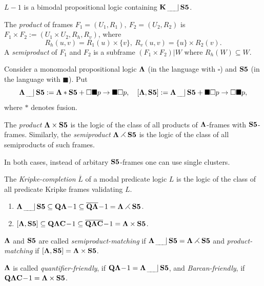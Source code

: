 \documentclass[twoside]{aiml20}
\def\bsq{\blacksquare}
\def\ri{\rightarrow}
\def\BK{{\bf K}}
\def\BQ{{\bf Q}}
\def\BC{{\bf C}}
\def\sqr{\square}
\def\bLa{{\bf \Lambda}}
\def\sem0{\,_{\_\!\_\!\_}\!|\,}
\def\sem{\,_{\_\!\_\!\_}\!|\,\bS5}
\def\rtt{\rightthreetimes}
\def\bC{{\bf C}}
\def\bLa{{\bf \Lambda}}
\def\bS5{{\bf S5}}
\def\ri{\rightarrow}
\def\sbq{\subseteq}
\def\sqr{\square}
\def\ti{\times}
\begin{document}
{\begin{lemma}\label{L12}
  $L\!-\!1$ is a bimodal
  propositional logic containing $\BK\sem$.
\end{lemma}

\begin{definition}
  The {\em product} of frames $F_1=(U_1,R_1),~F_2=(U_2,R_2)$ is\\
  $F_1\ti F_2:=(U_1\ti U_2,R_h,R_v)$, where
$$R_h(u,v)=R_1(u)\ti\{v\},~R_v(u,v)=\{u\}\ti R_2(v).$$
A {\em semiproduct} of $F_1$ and $F_2$ is
a subframe $(F_1\ti F_2)|W$ where $R_h(W)\sbq W$.
\end{definition}

Consider a monomodal propositional logic $\bLa$ (in the language with $\sqr$)
and $\bS5$ (in the language with $\bsq$). Put 
$$\bLa\,_{\_\!\_}\!|\,\bS5:=\bLa*\bS5+\sqr\bsq p\ri\bsq\sqr p, \quad
[\bLa,\bS5]:=\bLa\,_{\_\!\_}\!|\,\bS5+\bsq \sqr p\ri\sqr\bsq p,
$$
where $*$ denotes fusion. 

\begin{definition}
  The {\em product} $\bLa\ti \bS5$ is the logic of the class of all
  products of $\bLa$-frames with $\bS5$-frames. Similarly, the {\em
    semiproduct} $\bLa\rightthreetimes \bS5$ is the logic of the class
  of all semiproducts of such frames.
\end{definition}
In both cases, instead of arbitary $\bS5$-frames one can use single
clusters.

\begin{definition}
  The {\em Kripke-completion} $\overline{L}$ of a modal predicate
  logic $L$ is the logic of the class of all predicate Kripke frames
  validating $L$.
\end{definition}

\begin{lemma}
\begin{enumerate}
\item
$\bLa\sem\sbq \BQ\bLa\!-\!1\sbq\overline{\BQ\bLa}\!-\!1=\bLa\rightthreetimes \bS5$.
\item
$[\bLa,\bS5]\sbq \BQ\bLa\BC\!-\!1\sbq\overline{\BQ\bLa\bC}\!-\!1=\bLa\ti\bS5$.
\end{enumerate} 
\end{lemma}

\begin{definition}
  $\bLa$ and $\bS5$ are called {\em semiproduct-matching} if
  $\bLa\sem=\bLa\rtt\bS5$ and {\em product-matching} if
  $[\bLa,\bS5]=\bLa\ti\bS5$.

  $\bLa$ is called {\em quantifier-friendly}, if
  $\BQ\bLa\!-\!1=\bLa\sem$, and {\em Barcan-friendly}, if
  $\BQ\bLa\BC\!-\!1=\bLa\ti\bS5$.
\end{definition}

}
\end{document}
